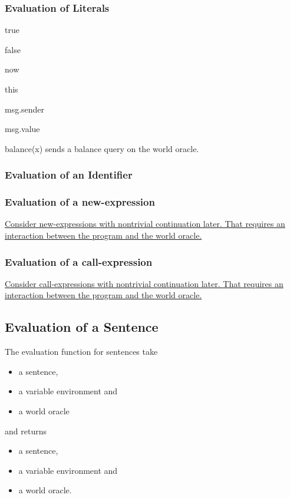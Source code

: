 \documentclass{book}
\newcommand{\todo}[1]{\underline{#1}}
\begin{document}
\subsubsection{Evaluation of Literals}

true

false

now

this

msg.sender

msg.value

balance(x) sends a balance query on the world oracle.

\subsubsection{Evaluation of an Identifier}

\subsubsection{Evaluation of a new-expression}

\todo{Consider new-expressions with nontrivial continuation later.  That requires an interaction between the program and the world oracle. }

\subsubsection{Evaluation of a call-expression}

\todo{Consider call-expressions with nontrivial continuation later.  That requires an interaction between the program and the world oracle. }

\subsection{Evaluation of a Sentence}

The evaluation function for sentences take
\begin{itemize}
\item a sentence,
\item a variable environment and
\item a world oracle
\end{itemize}
and returns
\begin{itemize}
\item a sentence,
\item a variable environment and
\item a world oracle.
\end{itemize}
\end{document}

